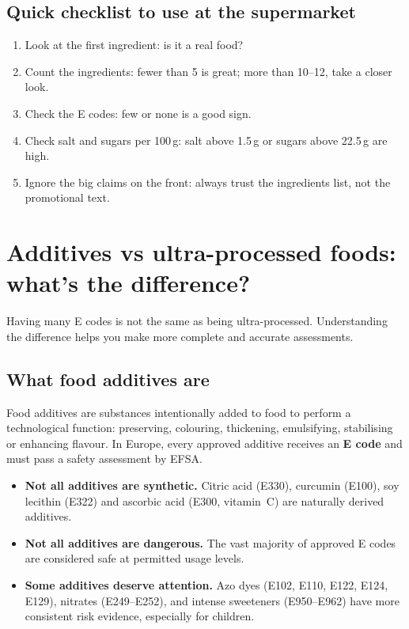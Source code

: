 \documentclass[a5paper,12pt,oneside,openany]{book}
\begin{document}
\section{Quick checklist to use at the supermarket}

\begin{enumerate}
  \item Look at the first ingredient: is it a real food?
  \item Count the ingredients: fewer than 5 is great; more than 10--12,
    take a closer look.
  \item Check the E codes: few or none is a good sign.
  \item Check salt and sugars per 100\,g: salt above 1.5\,g or sugars
    above 22.5\,g are high.
  \item Ignore the big claims on the front: always trust the ingredients
    list, not the promotional text.
\end{enumerate}

\chapter{Additives vs ultra-processed foods: what's the difference?}

Having many E codes is not the same as being ultra-processed.
Understanding the difference helps you make more complete and accurate
assessments.

\section{What food additives are}

Food additives are substances intentionally added to food to perform a
technological function: preserving, colouring, thickening, emulsifying,
stabilising or enhancing flavour. In Europe, every approved additive
receives an \textbf{E code} and must pass a safety assessment by EFSA.

\begin{itemize}
  \item \textbf{Not all additives are synthetic.} Citric acid (E330),
    curcumin (E100), soy lecithin (E322) and ascorbic acid (E300,
    vitamin~C) are naturally derived additives.
  \item \textbf{Not all additives are dangerous.} The vast majority of
    approved E codes are considered safe at permitted usage levels.
  \item \textbf{Some additives deserve attention.} Azo dyes (E102, E110,
    E122, E124, E129), nitrates (E249--E252), and intense sweeteners
    (E950--E962) have more consistent risk evidence, especially for
    children.
\end{itemize}
\end{document}

